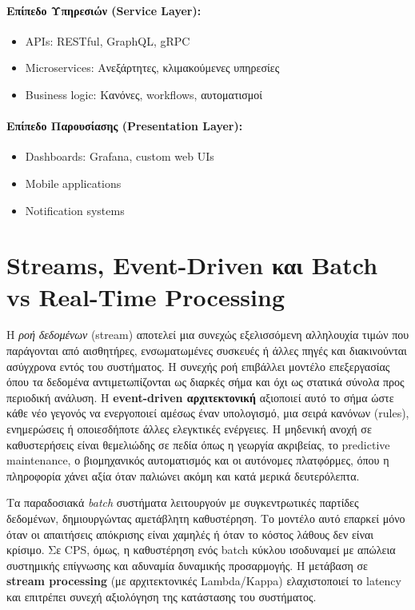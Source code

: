 \paragraph{Επίπεδο Υπηρεσιών (Service Layer):}
\begin{itemize}
	\item APIs: RESTful, GraphQL, gRPC
	\item Microservices: Ανεξάρτητες, κλιμακούμενες υπηρεσίες
	\item Business logic: Κανόνες, workflows, αυτοματισμοί
\end{itemize}

\paragraph{Επίπεδο Παρουσίασης (Presentation Layer):}
\begin{itemize}
	\item Dashboards: Grafana, custom web UIs
	\item Mobile applications
	\item Notification systems
\end{itemize}

\section{Streams, Event-Driven και Batch vs Real-Time Processing}

Η \textit{ροή δεδομένων} (stream) αποτελεί μια συνεχώς εξελισσόμενη αλληλουχία
τιμών που παράγονται από αισθητήρες, ενσωματωμένες συσκευές ή άλλες πηγές και
διακινούνται ασύγχρονα εντός του συστήματος. Η συνεχής ροή επιβάλλει μοντέλο
επεξεργασίας όπου τα δεδομένα αντιμετωπίζονται ως διαρκές σήμα και όχι ως
στατικά σύνολα προς περιοδική ανάλυση. Η \textbf{event-driven αρχιτεκτονική}
αξιοποιεί αυτό το σήμα ώστε κάθε νέο γεγονός να ενεργοποιεί αμέσως έναν
υπολογισμό, μια σειρά κανόνων (rules), ενημερώσεις ή οποιεσδήποτε άλλες
ελεγκτικές ενέργειες. Η μηδενική ανοχή σε καθυστερήσεις είναι θεμελιώδης σε
πεδία όπως η γεωργία ακριβείας, το predictive maintenance, ο βιομηχανικός
αυτοματισμός και οι αυτόνομες πλατφόρμες, όπου η πληροφορία χάνει αξία όταν
παλιώνει ακόμη και κατά μερικά δευτερόλεπτα.

Τα παραδοσιακά \textit{batch} συστήματα λειτουργούν με συγκεντρωτικές παρτίδες
δεδομένων, δημιουργώντας αμετάβλητη καθυστέρηση. Το μοντέλο αυτό επαρκεί μόνο
όταν οι απαιτήσεις απόκρισης είναι χαμηλές ή όταν το κόστος λάθους δεν είναι
κρίσιμο. Σε CPS, όμως, η καθυστέρηση ενός batch κύκλου ισοδυναμεί με απώλεια
συστημικής επίγνωσης και αδυναμία δυναμικής προσαρμογής. Η μετάβαση σε
\textbf{stream processing} (με αρχιτεκτονικές Lambda/Kappa) ελαχιστοποιεί το
latency και επιτρέπει συνεχή αξιολόγηση της κατάστασης του συστήματος.

